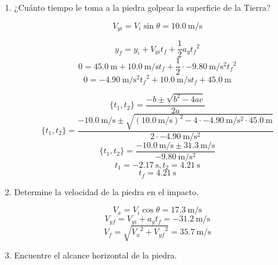 \documentclass[Física - Práctica.root.tex]{subfiles}
\begin{document}
\begin{enumerate}
        \begin{center}
        \end{center}

        \begin{enumerate}
          \item ¿Cuánto tiempo le toma a la piedra golpear la superficie de la Tierra?

                \[V_{yi}=V_i\sin{\theta}=\SI{10,0}{\meter\per\second}\]

                \[y_f=y_i+V_{yi}t_f+\frac{1}{2}a_y{t_f}^2\]
                \[0=\SI{45,0}{\meter}+\SI{10,0}{\meter\per\second}t_f+\frac{1}{2}\cdot\SI{-9,80}{\meter\per\second\squared}{t_f}^2\]
                \[0=\SI{-4,90}{\meter\per\second\squared}{t_f}^2+\SI{10,0}{\meter\per\second}t_f+\SI{45,0}{\meter}\]

                \[\{t_1,t_2\}=\frac{-b\pm\sqrt{b^2-4ac}}{2a}\]
                \[\{t_1,t_2\}=\frac{\SI{-10,0}{\meter\per\second}\pm\sqrt{(\SI{10,0}{\meter\per\second})^2-4\cdot\SI{-4,90}{\meter\per\second\squared}\cdot\SI{45,0}{\meter}}}{2\cdot\SI{-4,90}{\meter\per\second\squared}}\]
                \[\{t_1,t_2\}=\frac{\SI{-10,0}{\meter\per\second}\pm\SI{31,3}{\meter\per\second}}{\SI{-9,80}{\meter\per\second\squared}}\]
                \[t_1=\SI{-2,17}{\second}, t_2=\SI{4,21}{\second}\]
                \[t_f=\boxed{\SI{4,21}{\second}}\]

          \item Determine la velocidad de la piedra en el impacto.

                \[V_x=V_i\cos{\theta}=\SI{17,3}{\meter\per\second}\]
                \[V_{yf}=V_{yi}+a_yt_f=\SI{-31,2}{\meter\per\second}\]
                \[V_f=\sqrt{{V_x}^2+{V_{yf}}^2}=\boxed{\SI{35,7}{\meter\per\second}}\]

          \item Encuentre el alcance horizontal de la piedra.


\end{enumerate}
\end{enumerate}
\end{document}
